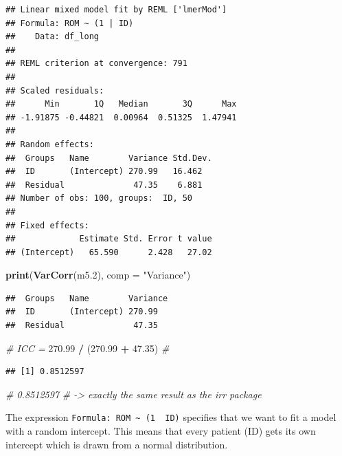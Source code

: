 \documentclass[
]{book}
\newenvironment{Shaded}{\begin{snugshade}}{\end{snugshade}}
\newcommand{\AttributeTok}[1]{\textcolor[rgb]{0.13,0.29,0.53}{#1}}
\newcommand{\CommentTok}[1]{\textcolor[rgb]{0.56,0.35,0.01}{\textit{#1}}}
\newcommand{\FloatTok}[1]{\textcolor[rgb]{0.00,0.00,0.81}{#1}}
\newcommand{\FunctionTok}[1]{\textcolor[rgb]{0.13,0.29,0.53}{\textbf{#1}}}
\newcommand{\NormalTok}[1]{#1}
\newcommand{\SpecialCharTok}[1]{\textcolor[rgb]{0.81,0.36,0.00}{\textbf{#1}}}
\newcommand{\StringTok}[1]{\textcolor[rgb]{0.31,0.60,0.02}{#1}}
\begin{document}
\begin{verbatim}
## Linear mixed model fit by REML ['lmerMod']
## Formula: ROM ~ (1 | ID)
##    Data: df_long
## 
## REML criterion at convergence: 791
## 
## Scaled residuals: 
##      Min       1Q   Median       3Q      Max 
## -1.91875 -0.44821  0.00964  0.51325  1.47941 
## 
## Random effects:
##  Groups   Name        Variance Std.Dev.
##  ID       (Intercept) 270.99   16.462  
##  Residual              47.35    6.881  
## Number of obs: 100, groups:  ID, 50
## 
## Fixed effects:
##             Estimate Std. Error t value
## (Intercept)   65.590      2.428   27.02
\end{verbatim}

\begin{Shaded}
\begin{Highlighting}[]
\FunctionTok{print}\NormalTok{(}\FunctionTok{VarCorr}\NormalTok{(m5}\FloatTok{.2}\NormalTok{), }\AttributeTok{comp =} \StringTok{"Variance"}\NormalTok{)}
\end{Highlighting}
\end{Shaded}

\begin{verbatim}
##  Groups   Name        Variance
##  ID       (Intercept) 270.99  
##  Residual              47.35
\end{verbatim}

\begin{Shaded}
\begin{Highlighting}[]
\CommentTok{\# ICC = }
\FloatTok{270.99} \SpecialCharTok{/}\NormalTok{ (}\FloatTok{270.99} \SpecialCharTok{+} \FloatTok{47.35}\NormalTok{) }\CommentTok{\# }
\end{Highlighting}
\end{Shaded}

\begin{verbatim}
## [1] 0.8512597
\end{verbatim}

\begin{Shaded}
\begin{Highlighting}[]
\CommentTok{\# 0.8512597}
\CommentTok{\# {-}\textgreater{} exactly the same result as the irr package}
\end{Highlighting}
\end{Shaded}

The expression \texttt{Formula:\ ROM\ \textasciitilde{}\ (1\ \textbar{}\ ID)} specifies that we want to fit a model with
a random intercept. This means that every patient (ID) gets its own intercept
which is drawn from a normal distribution.
\end{document}
